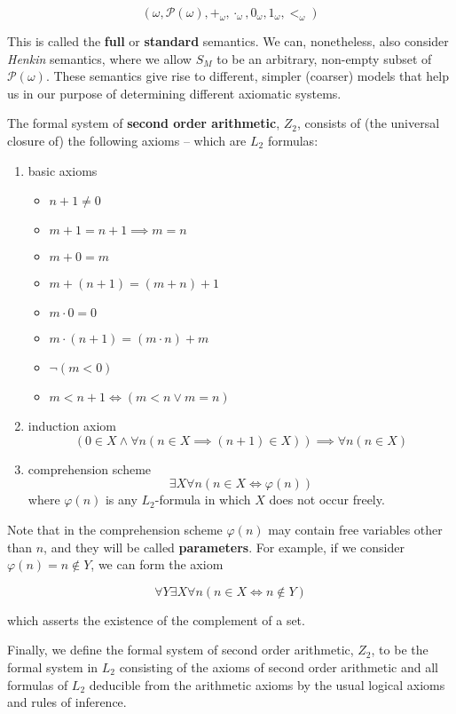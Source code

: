 \documentclass[../main.tex]{memoir}
\begin{document}
\[
  (\omega, \mathcal{P}(\omega), +_{\omega}, \cdot_{\omega}, 0_{\omega}, 1_{\omega}, <_{\omega})
\]

This is called the \textbf{full} or \textbf{standard} semantics. We can, nonetheless, also consider \textit{Henkin} semantics, where we allow $S_M$ to be an arbitrary, non-empty subset of $\mathcal{P}(\omega)$. These semantics give rise to different, simpler (coarser) models that help us in our purpose of determining different axiomatic systems.

The formal system of \textbf{second order arithmetic}, $Z_2$, consists of (the universal closure of) the following axioms -- which are $L_2$ formulas:

\begin{enumerate}[label=(\roman*), ref=(\roman*)]
\item basic axioms
  \begin{itemize}
  \item $n + 1 \neq 0$
  \item $m + 1 = n + 1 \implies m = n$
  \item $m + 0 = m$
  \item $m + (n + 1) = (m + n) + 1$
  \item $m \cdot 0 = 0$
  \item $m \cdot (n + 1) = (m \cdot n) + m$
  \item $\neg(m < 0)$
  \item $m < n + 1 \iff (m < n \lor m = n)$
  \end{itemize}
\item induction axiom
  $$(0 \in X \land \forall n (n \in X \implies (n + 1) \in X)) \implies \forall n (n \in X)$$
\item comprehension scheme
  $$\exists X \forall n (n \in X \iff \varphi(n))$$
  where $\varphi(n)$ is any $L_2$-formula in which $X$ does not occur freely.
\end{enumerate}

Note that in the comprehension scheme $\varphi(n)$ may contain free variables other than $n$, and they will be called \textbf{parameters}. For example, if we consider $\varphi(n) = n \not\in Y$, we can form the axiom

$$ \forall Y \exists X \forall n (n \in X \iff n \not\in Y) $$

which asserts the existence of the complement of a set.

Finally, we define the formal system of second order arithmetic, $Z_2$, to be the formal system in $L_2$ consisting of the axioms of second order arithmetic and all formulas of $L_2$ deducible from the arithmetic axioms by the usual logical axioms and rules of inference. \\
\end{document}
